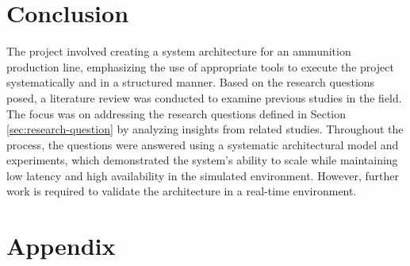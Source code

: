 



\section{Conclusion}
\label{sec:conclusion}

The project involved creating a system architecture for an ammunition production line, emphasizing the use of appropriate tools to execute the project systematically and in a structured manner. Based on the research questions posed, a literature review was conducted to examine previous studies in the field. The focus was on addressing the research questions defined in Section \ref{sec:research-question} by analyzing insights from related studies. Throughout the process, the questions were answered using a systematic architectural model and experiments, which demonstrated the system's ability to scale while maintaining low latency and high availability in the simulated environment. However, further work is required to validate the architecture in a real-time environment.



\newpage






\newpage

\section{Appendix}
\label{sec:appendix}

